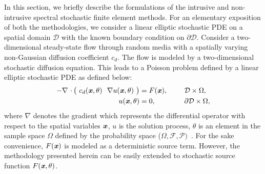 \documentclass[letter,1p,11pt,oneside,onecolumn,sort&compress]{elsarticle}
\begin{document}

In this section, we briefly describe the formulations of the intrusive and non-intrusive spectral stochastic finite element methods. For an elementary exposition of both the methodologies, we consider a linear elliptic stochastic PDE on a spatial domain $\mathcal{D}$ with the known boundary condition on $\partial \mathcal{D}$.
Consider a two-dimensional steady-state flow through random media with a spatially varying non-Gaussian diffusion coefficient $c_d$. The flow is modeled by a two-dimensional stochastic diffusion equation. This leads to a Poisson problem defined by a linear elliptic stochastic PDE %
as defined below:
\begin{align}\label{eq:sspe}
-\nabla \ \cdotp \big( \ c_d(\textbf{\textit{x}},\theta) \ \ \nabla u(\textbf{\textit{x}}, \theta) \ \big) &= {F}(\textbf{\textit{x}}),     \ \ \  \ \ \ \   \mathcal{D}\times \Omega, \\
u(\textbf{\textit{x}}, \theta) &= 0,    \ \ \  \ \ \ \  \ \ \ \ \  \partial \mathcal{D}\times \Omega,
\end{align}
where $\nabla$ denotes the gradient which represents the differential operator with respect to the spatial variables $\textbf{\textit{x}}$, $u$ is the solution process,  $\theta$ is an element in the sample space $\Omega$ defined by the probability space ($\Omega, \mathcal{F}, \mathcal{P})$~\cite{billingsley2008probability}.
For the sake convenience, $F(\textbf{\textit{x}})$ is modeled as a deterministic source term. However, the methodology presented herein can be easily extended to stochastic source function $F(\textbf{\textit{x}},\theta)$.
\end{document}
